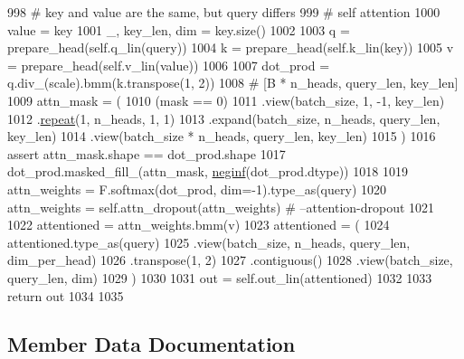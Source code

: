 \begin{DoxyCode}
998             \textcolor{comment}{# key and value are the same, but query differs}
999             \textcolor{comment}{# self attention}
1000             value = key
1001         \_, key\_len, dim = key.size()
1002 
1003         q = prepare\_head(self.q\_lin(query))
1004         k = prepare\_head(self.k\_lin(key))
1005         v = prepare\_head(self.v\_lin(value))
1006 
1007         dot\_prod = q.div\_(scale).bmm(k.transpose(1, 2))
1008         \textcolor{comment}{# [B * n\_heads, query\_len, key\_len]}
1009         attn\_mask = (
1010             (mask == 0)
1011             .view(batch\_size, 1, -1, key\_len)
1012             .\hyperlink{namespacerepeat}{repeat}(1, n\_heads, 1, 1)
1013             .expand(batch\_size, n\_heads, query\_len, key\_len)
1014             .view(batch\_size * n\_heads, query\_len, key\_len)
1015         )
1016         \textcolor{keyword}{assert} attn\_mask.shape == dot\_prod.shape
1017         dot\_prod.masked\_fill\_(attn\_mask, \hyperlink{namespaceparlai_1_1utils_1_1misc_a68c44ca571de7149b683539db659c330}{neginf}(dot\_prod.dtype))
1018 
1019         attn\_weights = F.softmax(dot\_prod, dim=-1).type\_as(query)
1020         attn\_weights = self.attn\_dropout(attn\_weights)  \textcolor{comment}{# --attention-dropout}
1021 
1022         attentioned = attn\_weights.bmm(v)
1023         attentioned = (
1024             attentioned.type\_as(query)
1025             .view(batch\_size, n\_heads, query\_len, dim\_per\_head)
1026             .transpose(1, 2)
1027             .contiguous()
1028             .view(batch\_size, query\_len, dim)
1029         )
1030 
1031         out = self.out\_lin(attentioned)
1032 
1033         \textcolor{keywordflow}{return} out
1034 
1035 
\end{DoxyCode}


\subsection{Member Data Documentation}
\mbox{\label{classparlai_1_1agents_1_1transformer_1_1modules_1_1MultiHeadAttention_ac1c0169222b929c580d1a786479d7ed2}} 
